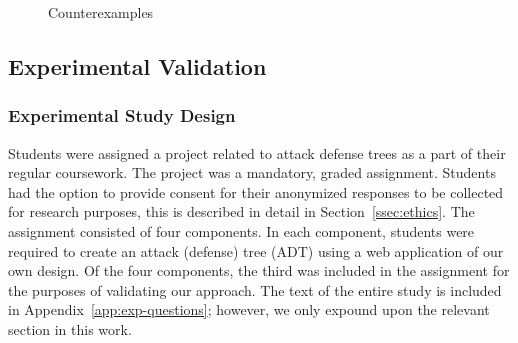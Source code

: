 \begin{figure*}
\begin{subfigure}[b]{\CEWidth}
{            
        }
        \label{fig:b}
    \end{subfigure}
\begin{subfigure}[b]{\CEWidth}
        \centering
        \resizebox{2cm}{!}{
            
        }
        \label{fig:b}
    \end{subfigure}
\begin{subfigure}[b]{\CEWidth}
        \centering
        \resizebox{2cm}{!}{
            
        }
        \label{fig:b}
    \end{subfigure}
\begin{subfigure}[b]{\CEWidth}
        \centering
        \resizebox{2cm}{!}{
            
        }
        \label{fig:b}
    \end{subfigure}
\begin{subfigure}[b]{\CEWidth}
        \centering
        \resizebox{1.8cm}{!}{
            
        }
        \label{fig:b}
    \end{subfigure}
    \caption{Counterexamples}\label{fig:counterexamples}
\end{figure*}





\subsection{Experimental Validation}

\subsubsection{Experimental Study Design}
\label{ssec:method-study-design}

Students were assigned a project related to attack defense trees as a part of their regular coursework. The project was a mandatory, graded assignment. Students had the option to provide consent for their anonymized responses to be collected for research purposes, this is described in detail in Section~\ref{ssec:ethics}. The assignment consisted of four components. In each component, students were required to create an attack (defense) tree (ADT) using a web application of our own design. Of the four components, the third was included in the assignment for the purposes of validating our approach. The text of the entire study is included in Appendix~\ref{app:exp-questions}; however, we only expound upon the relevant section in this work.

